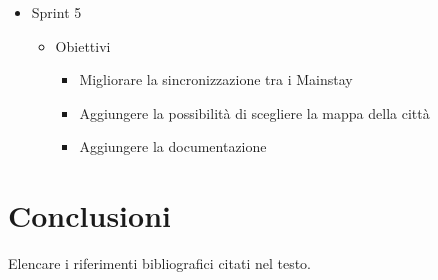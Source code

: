 \documentclass[12pt]{article}
\begin{document}
\begin{itemize}
    \item Sprint 5
    \begin{itemize}
        \item Obiettivi
        \begin{itemize}
            \item Migliorare la sincronizzazione tra i Mainstay
            \item Aggiungere la possibilità di scegliere la mappa della città
            \item Aggiungere la documentazione
        \end{itemize}
    \end{itemize}
\end{itemize}

\newpage



\section{Conclusioni}



\newpage

\begin{thebibliography}
    Elencare i riferimenti bibliografici citati nel testo.
\end{thebibliography}

\end{document}
